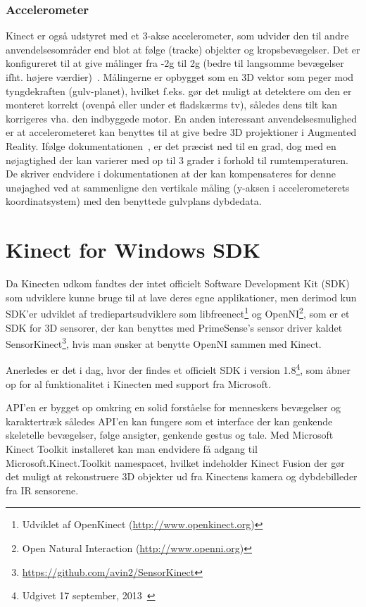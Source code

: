\subsubsection{Accelerometer}
Kinect er også udstyret med et 3-akse accelerometer, som udvider den til andre anvendelsesområder end blot at følge (tracke) objekter og kropsbevægelser.
Det er konfigureret til at give målinger fra -2g til 2g (bedre til langsomme bevægelser ifht. højere værdier)~\cite{kinectAccelerometer}.
Målingerne  er opbygget som en 3D vektor som peger mod tyngdekraften (gulv-planet), hvilket f.eks. gør det muligt at detektere om den er monteret korrekt (ovenpå eller under et fladskærms tv), således dens tilt kan korrigeres vha. den indbyggede motor.
En anden interessant anvendelsesmulighed er at accelerometeret kan benyttes til at give bedre 3D projektioner i Augmented Reality.
Ifølge dokumentationen~\cite{kinectDocAccelerometer}, er det præcist ned til en grad, dog med en nøjagtighed der kan varierer med op til 3 grader i forhold til rumtemperaturen.
De skriver endvidere i dokumentationen at der kan kompensateres for denne unøjaghed ved at sammenligne den vertikale måling (y-aksen i accelerometerets koordinatsystem) med den benyttede gulvplans dybdedata.


\section{Kinect for Windows SDK}
Da Kinecten udkom fandtes der intet officielt Software Development Kit (SDK) som udviklere kunne bruge til at lave deres egne applikationer, men derimod kun SDK'er udviklet af trediepartsudviklere som libfreenect\footnote{Udviklet af OpenKinect (\url{http://www.openkinect.org})} og OpenNI\footnote{Open Natural Interaction (\url{http://www.openni.org})}, som er et SDK for 3D sensorer, der kan benyttes med PrimeSense's sensor driver kaldet SensorKinect\footnote{\url{https://github.com/avin2/SensorKinect}}, hvis man ønsker at benytte OpenNI sammen med Kinect.


Anerledes er det i dag, hvor der findes et officielt SDK i version 1.8\footnote{Udgivet 17 september, 2013~\cite{kinectSDK18}}, som åbner op for al funktionalitet i Kinecten med support fra Microsoft.

API'en er bygget op omkring en solid forståelse for menneskers bevægelser og karaktertræk således API'en kan fungere som et interface der kan genkende skeletelle bevægelser, følge ansigter, genkende gestus og tale.
Med Microsoft Kinect Toolkit installeret kan man endvidere få adgang til Microsoft.Kinect.Toolkit namespacet, hvilket indeholder Kinect Fusion der gør det muligt at rekonstruere 3D objekter ud fra Kinectens kamera og dybdebilleder fra IR sensorene.~\cite{kinectForWindowsFeatures}


